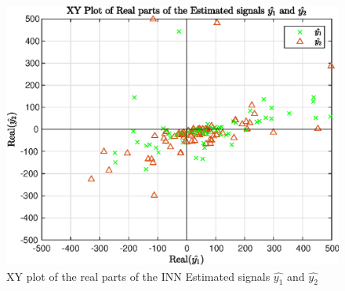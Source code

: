 \begin{figure}[H]
    \centering
    \includegraphics[width=\linewidth]{images/INNResult.eps}
    \caption{XY plot of the real parts of the INN Estimated signals $\hat{y_1}$ and $\hat{y_2}$ }
    \label{fig:INNyResult}
\end{figure}
